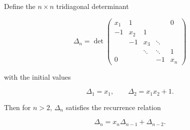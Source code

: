 Define the $n \times n$ tridiagonal determinant

$$\Delta_n = \det \begin{pmatrix}
x_1 & 1 & & & 0 \\
-1 & x_2 & 1 & & \\
& -1 & x_3 & \ddots & \\
& & \ddots & \ddots & 1 \\
0 & & & -1 & x_n
\end{pmatrix}$$

with the initial values

$$\Delta_1 = x_1, \qquad \Delta_2 = x_1 x_2 + 1.$$

Then for $n > 2$, $\Delta_n$ satisfies the recurrence relation

$$\Delta_n = x_n \Delta_{n-1} + \Delta_{n-2}.$$
